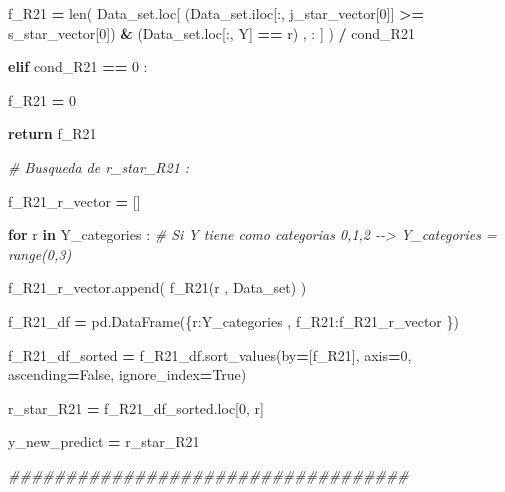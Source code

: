 \documentclass[
  11pt,
  a4paper,
]{article}
\newenvironment{Shaded}{\begin{snugshade}}{\end{snugshade}}
\newcommand{\BuiltInTok}[1]{#1}
\newcommand{\CommentTok}[1]{\textcolor[rgb]{0.56,0.35,0.01}{\textit{#1}}}
\newcommand{\ControlFlowTok}[1]{\textcolor[rgb]{0.13,0.29,0.53}{\textbf{#1}}}
\newcommand{\DecValTok}[1]{\textcolor[rgb]{0.00,0.00,0.81}{#1}}
\newcommand{\KeywordTok}[1]{\textcolor[rgb]{0.13,0.29,0.53}{\textbf{#1}}}
\newcommand{\NormalTok}[1]{#1}
\newcommand{\OperatorTok}[1]{\textcolor[rgb]{0.81,0.36,0.00}{\textbf{#1}}}
\newcommand{\StringTok}[1]{\textcolor[rgb]{0.31,0.60,0.02}{#1}}
\newcommand{\VariableTok}[1]{\textcolor[rgb]{0.00,0.00,0.00}{#1}}
\begin{document}
\begin{Shaded}
\begin{Highlighting}[]
\NormalTok{                        f\_R21 }\OperatorTok{=} \BuiltInTok{len}\NormalTok{( Data\_set.loc[ (Data\_set.iloc[:, j\_star\_vector[}\DecValTok{0}\NormalTok{]] }\OperatorTok{\textgreater{}=}\NormalTok{ s\_star\_vector[}\DecValTok{0}\NormalTok{]) }\OperatorTok{\&}\NormalTok{ (Data\_set.loc[:, }\StringTok{\textquotesingle{}Y\textquotesingle{}}\NormalTok{] }\OperatorTok{==}\NormalTok{ r) , : ] ) }\OperatorTok{/}\NormalTok{ cond\_R21}
            
                    \ControlFlowTok{elif}\NormalTok{ cond\_R21 }\OperatorTok{==} \DecValTok{0}\NormalTok{ :}

\NormalTok{                        f\_R21 }\OperatorTok{=} \DecValTok{0}

                    \ControlFlowTok{return}\NormalTok{ f\_R21}

            
            \CommentTok{\# Busqueda de r\_star\_R21 :}

\NormalTok{                f\_R21\_r\_vector }\OperatorTok{=}\NormalTok{ []}

                \ControlFlowTok{for}\NormalTok{ r }\KeywordTok{in}\NormalTok{ Y\_categories :  }\CommentTok{\# Si Y tiene como categorias 0,1,2 {-}{-}\textgreater{} Y\_categories = range(0,3)}

\NormalTok{                    f\_R21\_r\_vector.append( f\_R21(r , Data\_set) )}

\NormalTok{                f\_R21\_df }\OperatorTok{=}\NormalTok{ pd.DataFrame(\{}\StringTok{\textquotesingle{}r\textquotesingle{}}\NormalTok{:Y\_categories  , }\StringTok{\textquotesingle{}f\_R21\textquotesingle{}}\NormalTok{:f\_R21\_r\_vector \})}
        
\NormalTok{                f\_R21\_df\_sorted }\OperatorTok{=}\NormalTok{ f\_R21\_df.sort\_values(by}\OperatorTok{=}\NormalTok{[}\StringTok{\textquotesingle{}f\_R21\textquotesingle{}}\NormalTok{], axis}\OperatorTok{=}\DecValTok{0}\NormalTok{, ascending}\OperatorTok{=}\VariableTok{False}\NormalTok{, ignore\_index}\OperatorTok{=}\VariableTok{True}\NormalTok{)}

\NormalTok{                r\_star\_R21 }\OperatorTok{=}\NormalTok{ f\_R21\_df\_sorted.loc[}\DecValTok{0}\NormalTok{, }\StringTok{\textquotesingle{}r\textquotesingle{}}\NormalTok{]}

\NormalTok{                y\_new\_predict }\OperatorTok{=}\NormalTok{ r\_star\_R21 }

    \CommentTok{\#\#\#\#\#\#\#\#\#\#\#\#\#\#\#\#\#\#\#\#\#\#\#\#\#\#\#\#\#\#\#\#\#\#\#       }


\end{Highlighting}
\end{Shaded}
\end{document}
